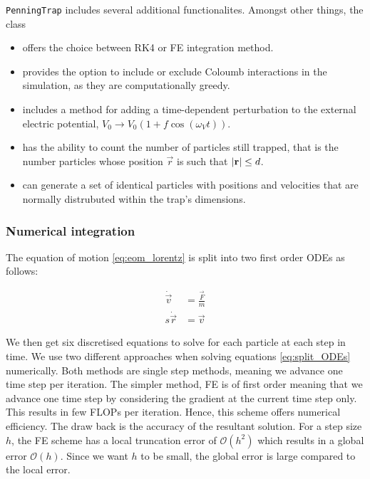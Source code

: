 

\texttt{PenningTrap} includes several additional functionalites. Amongst other things, the class

\begin{itemize}
    \item offers the choice between RK4 or FE integration method.
    \item provides the option to include or exclude Coloumb interactions in the simulation, as they are computationally greedy.
    \item includes a method for adding a time-dependent perturbation to the external electric potential, $V_0\rightarrow V_0 (1+ f\cos{(\omega_V t)})$.
    \item has the ability to count the number of particles still trapped, that is the number particles whose position $\vec{r}$ is such that $\abs{\mathbf{r}} \leq d$.
    \item can generate a set of identical particles with positions and velocities that are normally distrubuted within the trap's dimensions.
\end{itemize}

\subsubsection*{Numerical integration}
The equation of motion \eqref{eq:eom_lorentz} is split into two first order ODEs as follows:

\begin{equation}\label{eq:split_ODEs}
    \begin{split}
        \dot{\vec{v}} &= \frac{\vec{F}}{m} \\s
        \dot{\vec{r}} &= \vec{v}
    \end{split}
\end{equation}

We then get six discretised equations to solve for each particle at each step in time. We use two different approaches when solving equations \ref{eq:split_ODEs} numerically. Both methods are single step methods, meaning we advance one time step per iteration. The simpler method, FE \citep{Atkinson1989} is of first order meaning that we advance one time step by considering the gradient at the current time step only. This results in few FLOPs per iteration. Hence, this scheme offers numerical efficiency. The draw back is the accuracy of the resultant solution. For a step size $h$, the FE scheme has a local truncation error of $\mathcal{O}(h^2)$ which results in a global error $\mathcal{O}(h)$. Since we want $h$ to be small, the global error is large compared to the local error.  

